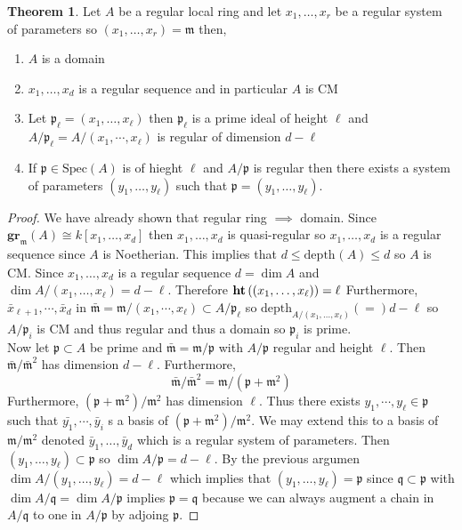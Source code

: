 \documentclass[12pt]{article}
\newcommand{\Spec}[1]{\mathrm{Spec}\left( #1 \right)}
\newcommand{\gr}[2]{\mathbf{gr}_{#1}\left(#2\right)}
\newcommand{\depth}[2]{\mathrm{depth}_{#1}\left(#2\right)}
\newcommand{\p}{\mathfrak{p}}
\newcommand{\q}{\mathfrak{q}}
\newcommand{\m}{\mathfrak{m}}
\theoremstyle{remark}
\theoremstyle{definition}
\newtheorem{theorem}{Theorem}[section]
\begin{document}
\begin{theorem}
Let $A$ be a regular local ring and let $x_1, \dots, x_r$ be a regular system of parameters so $(x_1, \dots, x_r) = \m$ then,
\begin{enumerate}
\item $A$ is a domain
\item $x_1, \dots, x_d$ is a regular sequence and in particular $A$ is CM
\item Let $\p_{\ell} = (x_1, \dots, x_\ell)$ then $\p_{\ell}$ is a prime ideal of height $\ell$ and $A / \p_{\ell} = A / (x_1, \cdots, x_\ell)$ is regular of dimension $d - \ell$
\item If $\p \in \Spec{A}$ is of hieght $\ell$ and $A / \p$ is regular then there exists a system of parameters $(y_1, \dots, y_{\ell})$ such that $\p = (y_1, \dots, y_{\ell})$. 
\end{enumerate}
\end{theorem}

\begin{proof}
We have already shown that regular ring $\implies$ domain. Since $\gr{\m}{A} \cong k[x_1, \dots, x_d]$ then $x_1, \dots, x_d$ is quasi-regular so $x_1, \dots, x_d$ is a regular sequence since $A$ is Noetherian. This implies that $d \le \depth{}{A} \le d$ so $A$ is CM. Since $x_1, \dots, x_d$ is a regular sequence $d = \dim{A}$ and $\dim{A / (x_1, \dots, x_\ell)} = d - \ell$. Therefore $\mathbf{ht}\left( (x_1, \dots, x_\ell) \right) = \ell$  Furthermore,
$\bar{x}_{\ell + 1}, \cdots, \bar{x}_d$ in $\bar{\m} = \m / (x_1, \cdots, x_\ell) \subset A / \p_{\ell}$ 
so $\depth{A / (x_1, \dots, x_\ell)} = d - \ell$ so $A / \p_i$ is CM and thus regular and thus a domain so $\p_i$ is prime.
\bigskip\\
Now let $\p \subset A$ be prime and $\bar{\m} = \m / \p$ with $A / \p$ regular and height $\ell$. Then $\bar{\m} / \bar{\m}^2$ has dimension $d - \ell$. Furthermore,
\[ \bar{\m} / \bar{\m}^2 = \m / (\p + \m^2) \]
Furthermore, $(\p + \m^2)/\m^2$ has dimension $\ell$. Thus there exists $y_1, \cdots, y_\ell \in \p$ such that $\bar{y_1}, \cdots, \bar{y}_i$ s a basis of $(\p + \m^2)/\m^2$. We may extend this to a basis of $\m / \m^2$ denoted $\bar{y}_1, \dots, \bar{y}_d$ which is a regular system of parameters. Then $(y_1, \dots, y_{\ell}) \subset \p$ so $\dim{A / \p} = d - \ell$. By the previous argumen $\dim{A / (y_1, \dots, y_{\ell})} = d - \ell$ which implies that $(y_1, \dots, y_\ell) = \p$ since $\q \subset \p$ with $\dim{A / \q} = \dim{A / \p}$ implies $\p = \q$ because we can always augment a chain in $A / \q$ to one in $A / \p$ by adjoing $\p$.  
\end{proof}
\end{document}
